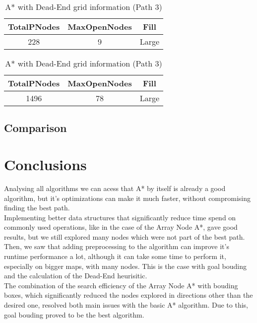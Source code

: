 \documentclass{article}
\begin{document}
  \begin{table}[h!]
    \parbox{.45\linewidth}{
        \centering
        \caption{A* with Dead-End grid information (Path 2)}
        \label{tab:tableDeadEndGrid2}
        \begin{tabular}{c|c|c}
          \textbf{TotalPNodes} & \textbf{MaxOpenNodes} & \textbf{Fill}\\
          \hline
          228 & 9 & Large\\
        \end{tabular}
    }
    \hfil
    \parbox{.45\linewidth}{
        \centering
        \caption{A* with Dead-End grid information (Path 3)}
        \label{tab:tableDeadEndGrid3}
        \begin{tabular}{c|c|c}
          \textbf{TotalPNodes} & \textbf{MaxOpenNodes} & \textbf{Fill}\\
          \hline
          1496 & 78 & Large\\
        \end{tabular}
    }
  \end{table}

  \subsection{Comparison}


  \section{Conclusions}
  Analysing all algorithms we can acess that A* by itself is already a good algorithm, but it's optimizations can make it much faster, 
  without compromising finding the best path.\\
  Implementing better data structures that significantly reduce time spend on commonly used operations, like in the case of the Array Node A*, 
  gave good results, but we still explored many nodes which were not part of the best path.\\
  Then, we saw that adding preprocessing to the algorithm can improve it's runtime performance a lot, although it can take some time to perform it, 
  especially on bigger maps, with many nodes. This is the case with goal bouding and the calculation of the Dead-End heurisitic.\\
  The combination of the search efficiency of the Array Node A* with bouding boxes, which significantly reduced the nodes explored 
  in directions other than the desired one, resolved both main issues with the basic A* algorithm. Due to this, goal bouding proved to be the best algorithm.
\end{document}
